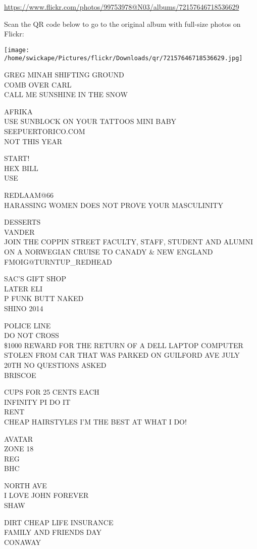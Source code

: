 \documentclass[10pt,letterpaper]{article}
\begin{document}
\url{https://www.flickr.com/photos/99753978@N03/albums/72157646718536629}

Scan the QR code below to go to the original album with full-size photos on Flickr:

\texttt{[image: /home/swickape/Pictures/flickr/Downloads/qr/72157646718536629.jpg]}
\pagebreak

GREG MINAH SHIFTING GROUND\\
COMB OVER CARL\\
CALL ME SUNSHINE IN THE SNOW

AFRIKA\\
USE SUNBLOCK ON YOUR TATTOOS MINI BABY\\
SEEPUERTORICO.COM\\
NOT THIS YEAR

START!\\
HEX BILL\\
USE

REDLAAM@66\\
HARASSING WOMEN DOES NOT PROVE YOUR MASCULINITY

DESSERTS\\
VANDER\\
JOIN THE COPPIN STREET FACULTY, STAFF, STUDENT AND ALUMNI ON A NORWEGIAN CRUISE TO CANADY \& NEW ENGLAND\\
FMOIG@TURNTUP\_REDHEAD

SAC'S GIFT SHOP\\
LATER ELI\\
P FUNK BUTT NAKED\\
SHINO 2014

POLICE LINE\\
DO NOT CROSS\\
\$1000 REWARD FOR THE RETURN OF A DELL LAPTOP COMPUTER STOLEN FROM CAR THAT WAS PARKED ON GUILFORD AVE JULY 20TH NO QUESTIONS ASKED\\
BRISCOE

CUPS FOR 25 CENTS EACH\\
INFINITY PI DO IT\\
RENT\\
CHEAP HAIRSTYLES I'M THE BEST AT WHAT I DO!

AVATAR\\
ZONE 18\\
REG\\
BHC

NORTH AVE\\
I LOVE JOHN FOREVER\\
SHAW

DIRT CHEAP LIFE INSURANCE\\
FAMILY AND FRIENDS DAY\\
CONAWAY
\end{document}
